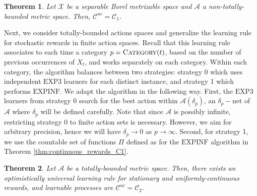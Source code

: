 \documentclass[aos]{imsart}
\theoremstyle{plain}
\newtheorem{theorem}{Theorem}[section]
\theoremstyle{remark}
\newcommand{\Acal}{\mathcal{A}}
\newcommand{\Ccal}{\mathcal{C}}
\newcommand{\Xcal}{\mathcal{X}}
\newcommand{\1}{\mathbbm{1}}%
\newcommand{\EXPINF}{\mathrm{EXPINF}}
\newcommand{\EXP}{\mathrm{EXP3}}
\begin{document}
\begin{theorem}
    Let $\Xcal$ be a separable Borel metrizable space and $\Acal$ a non-totally-bounded metric space. Then, $\Ccal ^{uc}=\Ccal_1$.
\end{theorem}

Next, we consider totally-bounded actions spaces and generalize the learning rule for stochastic rewards in finite action spaces. Recall that this learning rule associates to each time a category $p=\textsc{Category}(t)$, based on the number of previous occurrences of $X_t$, and works separately on each category. Within each category, the algorithm balances between two strategies: strategy 0 which uses independent $\EXP$ learners for each distinct instance, and strategy 1 which performs $\EXPINF$. We adapt the algorithm in the following way. First, the $\EXP$ learners from strategy 0 search for the best action within $\Acal(\delta_p)$, an $\delta_p-$net of $\Acal$ where $\delta_p$ will be defined carefully. Note that since $\Acal$ is possibly infinite, restricting strategy 0 to finite action sets is necessary. However, we aim for arbitrary precision, hence we will have $\delta_p\to 0$ as $p\to\infty$. Second, for strategy 1, we use the countable set of functions $\Pi$ defined as for the $\EXPINF$ algorithm in Theorem \ref{thm:continuous_rewards_C1}.

\begin{theorem}
Let $\Acal$ be a totally-bounded metric space. Then, there exists an optimistically universal learning rule for stationary and uniformly-continuous rewards, and learnable processes are $\Ccal ^{uc}=\Ccal_2$.
\end{theorem}
\end{document}
